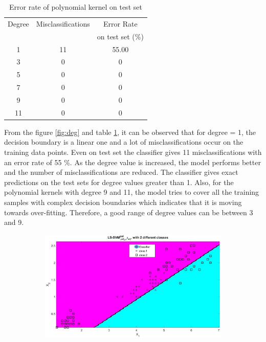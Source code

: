 {\begin{table}
	\caption{Error rate of polynomial kernel on test set}\label{table:1}
	\begin{tabular}{|c|c|c|}
		\hline
		Degree & Misclassifications & Error Rate \\
		&&on test set (\%)\\ \hline
		1 &11 & 55.00 \\ \hline
		3 &0 & 0 \\  \hline
		5 &0 & 0 \\  \hline
		7 &0 & 0 \\  \hline
		9 &0 & 0 \\  \hline
		11 &0 & 0 \\ \hline
	\end{tabular}
\end{table}
 From the figure \ref{fig:deg} and table \ref{table:1}, it can be observed that for degree = 1, the decision boundary is a linear one and a lot of misclassifications occur on the training data points. Even on test set the classifier gives 11 misclassifications with an error rate of 55 \%. As the degree value is increased, the model performs better and the number of misclassifications are reduced. The classifier gives exact predictions on the test sets for degree values greater than 1. Also, for the polynomial kernels with degree 9 and 11, the model tries to cover all the training samples with complex decision boundaries which indicates that it is moving towards over-fitting. Therefore, a good range of degree values can be between 3 and 9.\\
 \begin{figure}[!htbp] 
 	\centering
 	\begin{subfigure}{.33\textwidth}
 		\centering
 		\includegraphics[height=0.8\linewidth,width=1\linewidth]{Exercise1/Report/Ex1.3_deg(1).jpg}

\end{subfigure}
\end{figure}}
